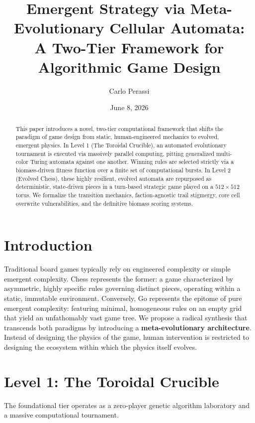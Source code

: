 \documentclass[11pt]{article}
\title{Emergent Strategy via Meta-Evolutionary Cellular Automata:\\A Two-Tier Framework for Algorithmic Game Design}
\author{Carlo Perassi}
\date{June 8, 2026}
\begin{document}
	
	\maketitle
	
	\begin{abstract}
		This paper introduces a novel, two-tier computational framework that shifts the paradigm of game design from static, human-engineered mechanics to evolved, emergent physics. %
		In Level 1 (The Toroidal Crucible), an automated evolutionary tournament is executed via massively parallel computing, pitting generalized multi-color Turing automata against one another. 
		Winning rules are selected strictly via a biomass-driven fitness function over a finite set of computational bursts. 
		In Level 2 (Evolved Chess), these highly resilient, evolved automata are repurposed as deterministic, state-driven pieces in a turn-based strategic game played on a $512 \times 512$ torus. %
		We formalize the transition mechanics, faction-agnostic trail stigmergy, core cell overwrite vulnerabilities, and the definitive biomass scoring systems. %
	\end{abstract}
	
	\section{Introduction}
	Traditional board games typically rely on engineered complexity or simple emergent complexity. %
	Chess represents the former: a game characterized by asymmetric, highly specific rules governing distinct pieces, operating within a static, immutable environment. %
	Conversely, Go represents the epitome of pure emergent complexity: featuring minimal, homogeneous rules on an empty grid that yield an unfathomably vast game tree. %
	We propose a radical synthesis that transcends both paradigms by introducing a \textbf{meta-evolutionary architecture}. %
	Instead of designing the physics of the game, human intervention is restricted to designing the ecosystem within which the physics itself evolves. %
	
	\section{Level 1: The Toroidal Crucible}
	The foundational tier operates as a zero-player genetic algorithm laboratory and a massive computational tournament. %
	
\end{document}

